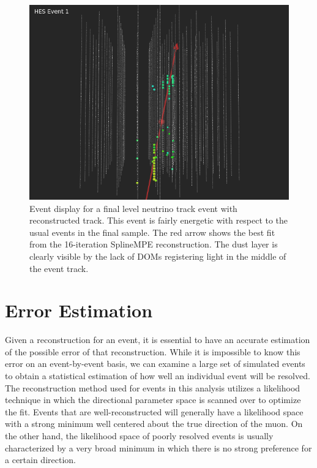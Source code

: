 \documentclass{gatech-thesis}
\begin{document}
\begin{figure}[ht]
  \begin{center}
    \includegraphics[width=1.0\textwidth,keepaspectratio]{HES_Upgoing_WithReco.png}
  \end{center}
  \caption[Final Level Reconstructed Event Display]{Event display for a final level neutrino track event with reconstructed track. This event is fairly energetic with respect to the usual events in the final sample. The red arrow shows the best fit from the 16-iteration SplineMPE reconstruction. The dust layer is clearly visible by the lack of DOMs registering light in the middle of the event track.}
  \label{fig:HESEventWithReco}
\end{figure}

\section{Error Estimation}
Given a reconstruction for an event, it is essential to have an accurate estimation of the possible error of that reconstruction. While it is impossible to know this error on an event-by-event basis, we can examine a large set of simulated events to obtain a statistical estimation of how well an individual event will be resolved. The reconstruction method used for events in this analysis utilizes a likelihood technique in which the directional parameter space is scanned over to optimize the fit. Events that are well-reconstructed will generally have a likelihood space with a strong minimum well centered about the true direction of the muon. On the other hand, the likelihood space of poorly resolved events is usually characterized by a very broad minimum in which there is no strong preference for a certain direction.
\end{document}
